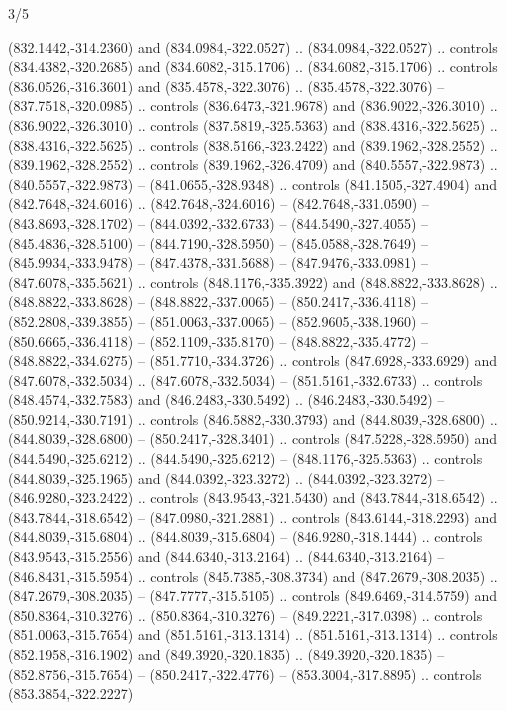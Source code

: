 \begin{flagdescription}{3/5}
\begin{scope}[xshift=0.5\flaglength,yshift=0.5\flagwidth,scale=\flagwidth/99]
\begin{scope}[y=0.8pt, x=0.8pt, yscale=-0.20628, xscale=0.20628,shift={(-500,-300)}]
\begin{scope}[cm={{0.79646,0.0,0.0,0.7753,(100.0721,273.79617)}}]
\begin{scope}[cm={{1.08438,0.0,0.0,1.08438,(-425.76596,333.57046)}}]
  (832.1442,-314.2360) and (834.0984,-322.0527) .. (834.0984,-322.0527) ..
  controls (834.4382,-320.2685) and (834.6082,-315.1706) .. (834.6082,-315.1706)
  .. controls (836.0526,-316.3601) and (835.4578,-322.3076) ..
  (835.4578,-322.3076) -- (837.7518,-320.0985) .. controls (836.6473,-321.9678)
  and (836.9022,-326.3010) .. (836.9022,-326.3010) .. controls
  (837.5819,-325.5363) and (838.4316,-322.5625) .. (838.4316,-322.5625) ..
  controls (838.5166,-323.2422) and (839.1962,-328.2552) .. (839.1962,-328.2552)
  .. controls (839.1962,-326.4709) and (840.5557,-322.9873) ..
  (840.5557,-322.9873) -- (841.0655,-328.9348) .. controls (841.1505,-327.4904)
  and (842.7648,-324.6016) .. (842.7648,-324.6016) -- (842.7648,-331.0590) --
  (843.8693,-328.1702) -- (844.0392,-332.6733) -- (844.5490,-327.4055) --
  (845.4836,-328.5100) -- (844.7190,-328.5950) -- (845.0588,-328.7649) --
  (845.9934,-333.9478) -- (847.4378,-331.5688) -- (847.9476,-333.0981) --
  (847.6078,-335.5621) .. controls (848.1176,-335.3922) and (848.8822,-333.8628)
  .. (848.8822,-333.8628) -- (848.8822,-337.0065) -- (850.2417,-336.4118) --
  (852.2808,-339.3855) -- (851.0063,-337.0065) -- (852.9605,-338.1960) --
  (850.6665,-336.4118) -- (852.1109,-335.8170) -- (848.8822,-335.4772) --
  (848.8822,-334.6275) -- (851.7710,-334.3726) .. controls (847.6928,-333.6929)
  and (847.6078,-332.5034) .. (847.6078,-332.5034) -- (851.5161,-332.6733) ..
  controls (848.4574,-332.7583) and (846.2483,-330.5492) .. (846.2483,-330.5492)
  -- (850.9214,-330.7191) .. controls (846.5882,-330.3793) and
  (844.8039,-328.6800) .. (844.8039,-328.6800) -- (850.2417,-328.3401) ..
  controls (847.5228,-328.5950) and (844.5490,-325.6212) .. (844.5490,-325.6212)
  -- (848.1176,-325.5363) .. controls (844.8039,-325.1965) and
  (844.0392,-323.3272) .. (844.0392,-323.3272) -- (846.9280,-323.2422) ..
  controls (843.9543,-321.5430) and (843.7844,-318.6542) .. (843.7844,-318.6542)
  -- (847.0980,-321.2881) .. controls (843.6144,-318.2293) and
  (844.8039,-315.6804) .. (844.8039,-315.6804) -- (846.9280,-318.1444) ..
  controls (843.9543,-315.2556) and (844.6340,-313.2164) .. (844.6340,-313.2164)
  -- (846.8431,-315.5954) .. controls (845.7385,-308.3734) and
  (847.2679,-308.2035) .. (847.2679,-308.2035) -- (847.7777,-315.5105) ..
  controls (849.6469,-314.5759) and (850.8364,-310.3276) .. (850.8364,-310.3276)
  -- (849.2221,-317.0398) .. controls (851.0063,-315.7654) and
  (851.5161,-313.1314) .. (851.5161,-313.1314) .. controls (852.1958,-316.1902)
  and (849.3920,-320.1835) .. (849.3920,-320.1835) -- (852.8756,-315.7654) --
  (850.2417,-322.4776) -- (853.3004,-317.8895) .. controls (853.3854,-322.2227)

\end{scope}
\end{scope}
\end{scope}
\end{scope}
\end{flagdescription}

